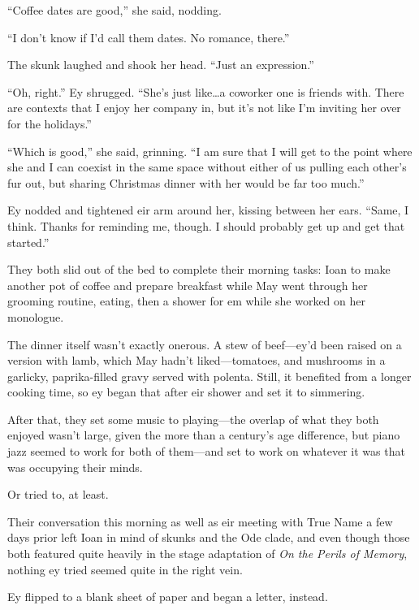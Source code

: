 ``Coffee dates are good,'' she said, nodding.

``I don't know if I'd call them dates. No romance, there.''

The skunk laughed and shook her head. ``Just an expression.''

``Oh, right.'' Ey shrugged. ``She's just like\ldots a coworker one is friends with. There are contexts that I enjoy her company in, but it's not like I'm inviting her over for the holidays.''

``Which is good,'' she said, grinning. ``I am sure that I will get to the point where she and I can coexist in the same space without either of us pulling each other's fur out, but sharing Christmas dinner with her would be far too much.''

Ey nodded and tightened eir arm around her, kissing between her ears. ``Same, I think. Thanks for reminding me, though. I should probably get up and get that started.''

They both slid out of the bed to complete their morning tasks: Ioan to make another pot of coffee and prepare breakfast while May went through her grooming routine, eating, then a shower for em while she worked on her monologue.

The dinner itself wasn't exactly onerous. A stew of beef—ey'd been raised on a version with lamb, which May hadn't liked—tomatoes, and mushrooms in a garlicky, paprika-filled gravy served with polenta. Still, it benefited from a longer cooking time, so ey began that after eir shower and set it to \mbox{simmering}.

After that, they set some music to playing—the overlap of what they both enjoyed wasn't large, given the more than a century's age difference, but piano jazz seemed to work for both of them—and set to work on whatever it was that was occupying their minds.

Or tried to, at least.

Their conversation this morning as well as eir meeting with True Name a few days prior left Ioan in mind of skunks and the Ode clade, and even though those both featured quite heavily in the stage adaptation of \emph{On the Perils of Memory}, nothing ey tried seemed quite in the right vein.

Ey flipped to a blank sheet of paper and began a letter, instead.


